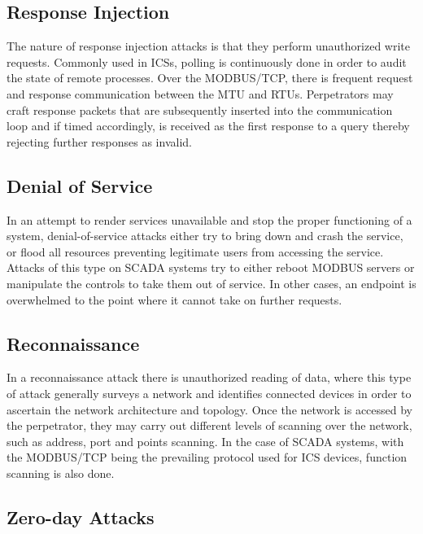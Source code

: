 \documentclass[12pt,]{article}
\begin{document}
\subsection{Response Injection}\label{response-injection}

The nature of response injection attacks is that they perform
unauthorized write requests. Commonly used in ICSs, polling is
continuously done in order to audit the state of remote processes. Over
the MODBUS/TCP, there is frequent request and response communication
between the MTU and RTUs. Perpetrators may craft response packets that
are subsequently inserted into the communication loop and if timed
accordingly, is received as the first response to a query thereby
rejecting further responses as invalid.

\subsection{Denial of Service}\label{denial-of-service}

In an attempt to render services unavailable and stop the proper
functioning of a system, denial-of-service attacks either try to bring
down and crash the service, or flood all resources preventing legitimate
users from accessing the service. Attacks of this type on SCADA systems
try to either reboot MODBUS servers or manipulate the controls to take
them out of service. In other cases, an endpoint is overwhelmed to the
point where it cannot take on further requests.

\subsection{Reconnaissance}\label{reconnaissance}

In a reconnaissance attack there is unauthorized reading of data, where
this type of attack generally surveys a network and identifies connected
devices in order to ascertain the network architecture and topology.
Once the network is accessed by the perpetrator, they may carry out
different levels of scanning over the network, such as address, port and
points scanning. In the case of SCADA systems, with the MODBUS/TCP being
the prevailing protocol used for ICS devices, function scanning is also
done.

\subsection{Zero-day Attacks}\label{zero-day-attacks}
\end{document}
